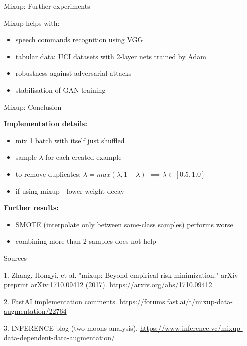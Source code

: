 \documentclass{beamer}
\begin{document}
\begin{frame}{Mixup: Further experiments}

Mixup helps with:
\begin{itemize}
\item speech commands recognition using VGG
\item tabular data: UCI datasets with 2-layer nets trained by Adam
\item robustness against adversarial attacks
\item stabilisation of GAN training
\end{itemize}

\end{frame}
\begin{frame}{Mixup: Conclusion}

\textbf{Implementation details:}
\begin{itemize}
\item mix 1 batch with itself just shuffled
\item sample $\lambda$ for each created example
\item to remove duplicates: $\lambda = max(\lambda, 1 - \lambda)$ $\implies \lambda \in [0.5, 1.0]$ 
\item if using mixup - lower weight decay
\end{itemize}

\vfill

\textbf{Further results:}
\begin{itemize}
\item SMOTE (interpolate only between same-class samples) performs worse
\item combining more than 2 samples does not help
\end{itemize}

\end{frame}

\begin{frame}{Sources}
\begin{thebibliography}{0}

   1. Zhang, Hongyi, et al. "mixup: Beyond empirical risk minimization." arXiv preprint arXiv:1710.09412 (2017). \url{https://arxiv.org/abs/1710.09412}
  
   2. FastAI implementation comments. \url{https://forums.fast.ai/t/mixup-data-augmentation/22764}
  
   3. INFERENCE blog (two moons analysis). \url{https://www.inference.vc/mixup-data-dependent-data-augmentation/} 
  
\end{thebibliography}

\end{frame}

 
\end{document}
